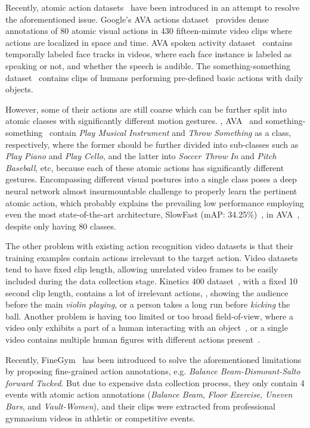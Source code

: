\documentclass[10pt,twocolumn,letterpaper]{article}
\begin{document}
Recently, atomic action datasets~\cite{ava_speech,goyal2017something,AVA,ava_speaker,finegym} have been introduced in an attempt to resolve the aforementioned issue. Google's AVA actions dataset~\cite{AVA} provides dense annotations of 80 atomic visual actions in 430 fifteen-minute video clips where actions are localized in space and time. AVA spoken activity dataset~\cite{ava_speaker} contains temporally labeled face tracks in videos, where each face instance is labeled as speaking or not, and whether the speech is audible. The something-something dataset~\cite{goyal2017something} contains clips of humans performing pre-defined basic actions with daily objects.

However, some of their actions are still coarse which can be further split into atomic classes with significantly different motion gestures. \eg, AVA~\cite{AVA} and something-something~\cite{goyal2017something} contain \textit{Play Musical Instrument} and \textit{Throw Something} as a class, respectively, where the former should be further divided into sub-classes such as \textit{Play Piano} and \textit{Play Cello}, and the latter into \textit{Soccer Throw In} and \textit{Pitch Baseball}, etc, because each of these atomic actions has significantly different gestures. Encompassing different visual postures into a single class poses a deep neural network almost insurmountable challenge to properly learn the pertinent atomic action, which probably explains the prevailing low performance employing even the most state-of-the-art architecture, SlowFast (mAP: 34.25\%)~\cite{slowfast}, in AVA~\cite{AVA}, despite only having 80 classes. 

The other problem with existing action recognition video datasets is that their training examples contain actions irrelevant to the target action. 
Video datasets tend to have fixed clip length, allowing unrelated video frames to be easily included during the data collection stage. Kinetics 400 dataset~\cite{kinetics400}, with a fixed 10 second clip length, contains a lot of irrelevant actions, \eg, showing the audience before the main \textit{violin playing}, or a person takes a long run before \textit{kicking} the ball.
Another problem is having too limited or too broad field-of-view, where a video only exhibits a part of a human interacting with an object~\cite{goyal2017something}, or a single video contains multiple human figures with different actions present~\cite{AVA,kinetics400,zhao2019hacs}.

Recently, FineGym~\cite{finegym} has been introduced to solve the aforementioned limitations by proposing fine-grained action annotations, e.g. \textit{Balance Beam-Dismount-Salto forward Tucked}. But due to expensive data collection process, they only contain 4 events with atomic action annotations (\textit{Balance Beam}, \textit{Floor Exercise}, \textit{Uneven Bars}, and \textit{Vault-Women}), and their clips were extracted from professional gymnasium videos in athletic or competitive events.
\end{document}

